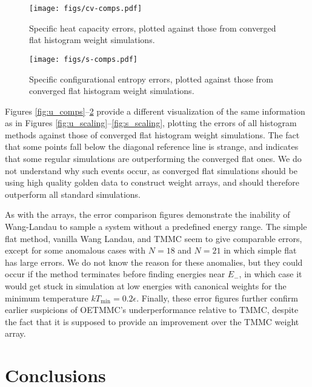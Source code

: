 \documentclass[11pt]{article}
\renewcommand{\t}{\text} %
\begin{document}
\begin{figure}[!p]
  \centering
  \texttt{[image: figs/cv-comps.pdf]}
  \caption[Heat capacity error comparisons]
  {Specific heat capacity errors, plotted against those from converged
    flat histogram weight simulations.}
  \label{fig:cv_comps}
\end{figure}

\begin{figure}[!p]
  \centering
  \texttt{[image: figs/s-comps.pdf]}
  \caption[Configurational entropy error comparisons]
  {Specific configurational entropy errors, plotted against those from
    converged flat histogram weight simulations.}
  \label{fig:s_comps}
\end{figure}

Figures \ref{fig:u_comps}--\ref{fig:s_comps} provide a different
visualization of the same information as in Figures
\ref{fig:u_scaling}--\ref{fig:s_scaling}, plotting the errors of all
histogram methods against those of converged flat histogram weight
simulations. The fact that some points fall below the diagonal
reference line is strange, and indicates that some regular simulations
are outperforming the converged flat ones. We do not understand why
such events occur, as converged flat simulations should be using high
quality golden data to construct weight arrays, and should therefore
outperform all standard simulations.

As with the arrays, the error comparison figures demonstrate the
inability of Wang-Landau to sample a system without a predefined
energy range. The simple flat method, vanilla Wang Landau, and TMMC
seem to give comparable errors, except for some anomalous cases with
$N=18$ and $N=21$ in which simple flat has large errors. We do not
know the reason for these anomalies, but they could occur if the
method terminates before finding energies near $E_-$, in which case it
would get stuck in simulation at low energies with canonical weights
for the minimum temperature $kT_{\t{min}}=0.2\epsilon$. Finally, these
error figures further confirm earlier suspicions of OETMMC's
underperformance relative to TMMC, despite the fact that it is
supposed to provide an improvement over the TMMC weight array.


\section{Conclusions}
\label{sec:conclusions}
\end{document}
